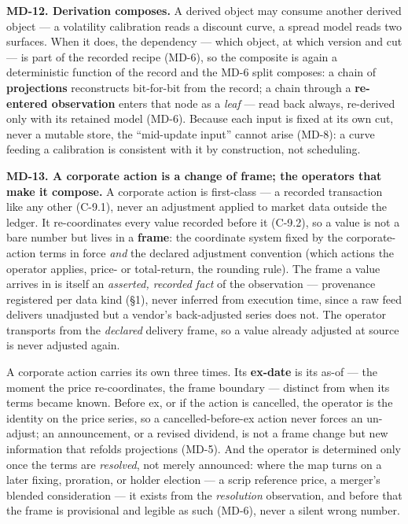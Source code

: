 \documentclass[11pt,a4paper]{article}
\newcommand{\mlabel}[1]{\leavevmode\hypertarget{md-#1}{}%
  \marginpar{\raggedright\scriptsize\ttfamily\textcolor{gray}{#1}}}
\newcommand{\trace}[1]{\par\smallskip{\small\itshape (#1)}}
\begin{document}
\mlabel{MD-12}\textbf{MD-12. Derivation composes.} A derived object may
consume another derived object --- a volatility calibration reads a
discount curve, a spread model reads two surfaces. When it does, the
dependency --- which object, at which version and cut --- is part of the
recorded recipe (MD-6), so the composite is again a deterministic function
of the record and the MD-6 split composes: a chain of \textbf{projections}
reconstructs bit-for-bit from the record; a chain through a
\textbf{re-entered observation} enters that node as a \emph{leaf} --- read
back always, re-derived only with its retained model (MD-6). Because each
input is fixed at its own cut, never a mutable store, the ``mid-update
input'' cannot arise (MD-8): a curve feeding a calibration is consistent
with it by construction, not scheduling.
\trace{Reproducibility, Correctness; C-2.2, C-14.11.}

\mlabel{MD-13}\textbf{MD-13. A corporate action is a change of frame; the
operators that make it compose.} A corporate action is first-class --- a
recorded transaction like any other (C-9.1), never an adjustment applied
to market data outside the ledger. It re-coordinates every value recorded
before it (C-9.2), so a value is not a bare number but lives in a
\textbf{frame}: the coordinate system fixed by the corporate-action terms
in force \emph{and} the declared adjustment convention (which actions the
operator applies, price- or total-return, the rounding rule). The frame a
value arrives in is itself an \emph{asserted, recorded
fact} of the observation --- provenance registered per data kind (\S1),
never inferred from execution time, since a raw feed delivers unadjusted
but a vendor's back-adjusted series does not. The operator transports from
the \emph{declared} delivery frame, so a value already adjusted at source
is never adjusted again.

A corporate action carries its own three times. Its \textbf{ex-date} is
its as-of --- the moment the price re-coordinates, the frame boundary ---
distinct from when its terms became known. Before ex, or if the action is
cancelled, the operator is the identity on the price series, so a
cancelled-before-ex action never forces an un-adjust; an announcement, or
a revised dividend, is not a frame change but new information that refolds
projections (MD-5). And the operator is determined only once the terms are
\emph{resolved}, not merely announced: where the map turns on a later
fixing, proration, or holder election --- a scrip reference price, a
merger's blended consideration --- it exists from the \emph{resolution}
observation, and before that the frame is provisional and legible as such
(MD-6), never a silent wrong number.
\end{document}

